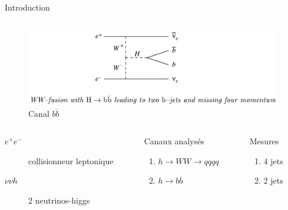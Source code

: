 \documentclass[9pt]{beamer}
\newcommand{\bbar}{\overline{b}}
\begin{document}
\begin{frame}{Introduction}
\begin{columns}
		\begin{column}{0.3\textwidth}
			\begin{figure}
				\centering
				\includegraphics[width=\textwidth]{../img/nnh_bb.png} 
				\caption{Canal $b\overline{b}$}
			\end{figure}
		\end{column}
		
	\end{columns}

	

	\begin{columns}
		
		\begin{column}{0.45\textwidth}
			\begin{description}
				\item[$e^{+} e^{-}$] collisionneur leptonique
				\item[$\nu \nu h$] 2 neutrinos-higgs
			\end{description}
		\end{column}
		
		\begin{column}{0.3\textwidth}
			\begin{block}{Canaux analysés}
				\begin{enumerate}
					\item $h \longrightarrow WW \longrightarrow qqqq$
					\item $h \longrightarrow b\bbar$
				\end{enumerate}
			\end{block}
        \end{column}
		
		\begin{column}{0.15\textwidth}
            \begin{block}{Mesures}
                \begin{enumerate}
                    \item 4 jets
                    \item 2 jets
                \end{enumerate}
            \end{block}
		\end{column}
	\end{columns}
    
\end{frame}
\end{document}

